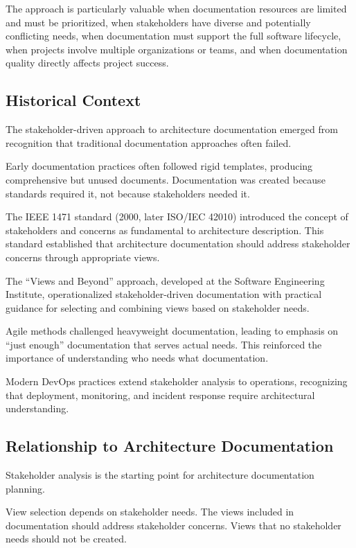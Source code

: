 \documentclass[11pt]{article}
\begin{document}
The approach is particularly valuable when documentation resources are limited and must be prioritized, when stakeholders have diverse and potentially conflicting needs, when documentation must support the full software lifecycle, when projects involve multiple organizations or teams, and when documentation quality directly affects project success.

\subsection{Historical Context}

The stakeholder-driven approach to architecture documentation emerged from recognition that traditional documentation approaches often failed.

Early documentation practices often followed rigid templates, producing comprehensive but unused documents. Documentation was created because standards required it, not because stakeholders needed it.

The IEEE 1471 standard (2000, later ISO/IEC 42010) introduced the concept of stakeholders and concerns as fundamental to architecture description. This standard established that architecture documentation should address stakeholder concerns through appropriate views.

The ``Views and Beyond'' approach, developed at the Software Engineering Institute, operationalized stakeholder-driven documentation with practical guidance for selecting and combining views based on stakeholder needs.

Agile methods challenged heavyweight documentation, leading to emphasis on ``just enough'' documentation that serves actual needs. This reinforced the importance of understanding who needs what documentation.

Modern DevOps practices extend stakeholder analysis to operations, recognizing that deployment, monitoring, and incident response require architectural understanding.

\subsection{Relationship to Architecture Documentation}

Stakeholder analysis is the starting point for architecture documentation planning.

View selection depends on stakeholder needs. The views included in documentation should address stakeholder concerns. Views that no stakeholder needs should not be created.
\end{document}
